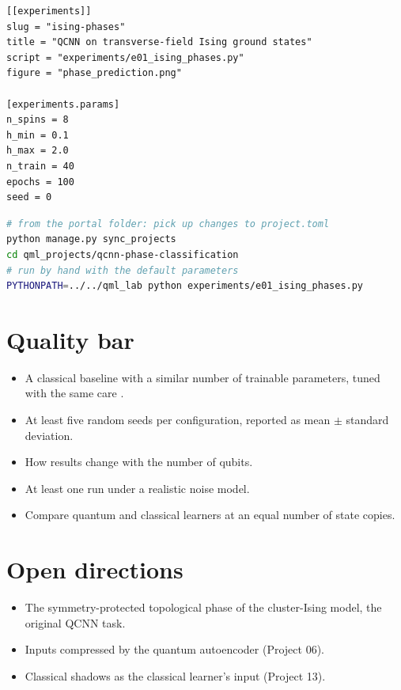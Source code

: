 \documentclass[11pt,a4paper]{article}
\begin{document}
\begin{lstlisting}[language={}]
[[experiments]]
slug = "ising-phases"
title = "QCNN on transverse-field Ising ground states"
script = "experiments/e01_ising_phases.py"
figure = "phase_prediction.png"

[experiments.params]
n_spins = 8
h_min = 0.1
h_max = 2.0
n_train = 40
epochs = 100
seed = 0
\end{lstlisting}

\begin{lstlisting}[language=bash]
# from the portal folder: pick up changes to project.toml
python manage.py sync_projects
cd qml_projects/qcnn-phase-classification
# run by hand with the default parameters
PYTHONPATH=../../qml_lab python experiments/e01_ising_phases.py
\end{lstlisting}

\section{Quality bar}
\begin{itemize}
  \item A classical baseline with a similar number of trainable parameters, tuned with the same care \citep{bowles2024}.
  \item At least five random seeds per configuration, reported as mean $\pm$ standard deviation.
  \item How results change with the number of qubits.
  \item At least one run under a realistic noise model.
  \item Compare quantum and classical learners at an equal number of state copies.
\end{itemize}

\section{Open directions}
\begin{itemize}
  \item The symmetry-protected topological phase of the cluster-Ising model, the original QCNN task.
  \item Inputs compressed by the quantum autoencoder (Project 06).
  \item Classical shadows as the classical learner's input (Project 13).
\end{itemize}
\end{document}
